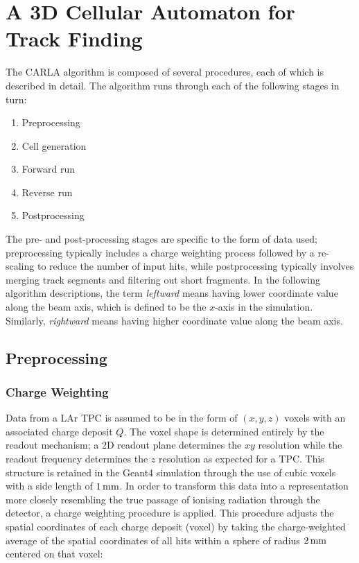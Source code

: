 \section{A 3D Cellular Automaton for Track Finding}\label{sec:cellularautomaton_algorithm}
The \ac{CARLA} algorithm is composed of several procedures, each of which is described in detail. The algorithm runs through each of the following stages in turn:

\begin{enumerate}
	\item Preprocessing
	\item Cell generation
	\item Forward run
	\item Reverse run
	\item Postprocessing
\end{enumerate}

The pre- and post-processing stages are specific to the form of data used; preprocessing typically includes a charge weighting process followed by a re-scaling to reduce the number of input hits, while postprocessing typically involves merging track segments and filtering out short fragments. In the following algorithm descriptions, the term \emph{leftward} means having lower coordinate value along the beam axis, which is defined to be the $x$-axis in the simulation. Similarly, \emph{rightward} means having higher coordinate value along the beam axis.

\subsection{Preprocessing}\label{sec:cellularautomaton_preprocessing}
\subsubsection{Charge Weighting}\label{sec:cellularautomaton_charge_weighting}
Data from a \ac{LAr TPC} is assumed to be in the form of $(x, y, z)$ voxels with an associated charge deposit $Q$. The voxel shape is determined entirely by the readout mechanism; a 2D readout plane determines the $xy$ resolution while the readout frequency determines the $z$ resolution as expected for a \ac{TPC}. This structure is retained in the Geant4 simulation through the use of cubic voxels with a side length of $1\,\mathrm{mm}$. In order to transform this data into a representation more closely resembling the true passage of ionising radiation through the detector, a charge weighting procedure is applied. This procedure adjusts the spatial coordinates of each charge deposit (voxel) by taking the charge-weighted average of the spatial coordinates of all hits within a sphere of radius $2\,\mathrm{mm}$ centered on that voxel:

